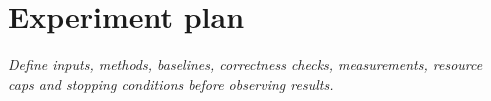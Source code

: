 \section{Experiment plan}
\label{sec:plan}
\emph{Define inputs, methods, baselines, correctness checks, measurements,
resource caps and stopping conditions before observing results.}
